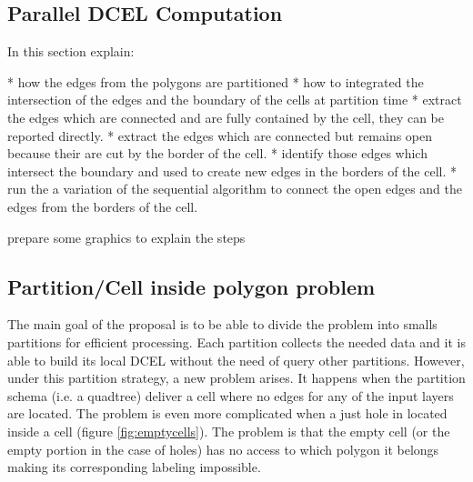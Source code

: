 \subsection{Parallel DCEL Computation}
In this section explain:

* how the edges from the polygons are partitioned
* how to integrated the intersection of the edges and the boundary of the cells at partition time
* extract the edges which are connected and are fully contained by the cell, they can be reported directly.
* extract the edges which are connected but remains open because their are cut by the border of the cell.
* identify those edges which intersect the boundary and used to create new edges in the borders of the cell.  
* run the a variation of the sequential algorithm to connect the open edges and the edges from the borders of the cell.

prepare some graphics to explain the steps


\subsection{Partition/Cell inside polygon problem} \label{sec:anomalies}
The main goal of the proposal is to be able to divide the problem into smalls partitions for efficient processing.  Each partition collects the needed data and it is able to build its local DCEL without the need of query other partitions.  However, under this partition strategy, a new problem arises.  It happens when the partition schema (i.e. a quadtree) deliver a cell where no edges for any of the input layers are located.  The problem is even more complicated when a just hole in located inside a cell (figure \ref{fig:emptycells}).  The problem is that the empty cell (or the empty portion in the case of holes) has no access to which polygon it belongs making its corresponding labeling impossible.  

